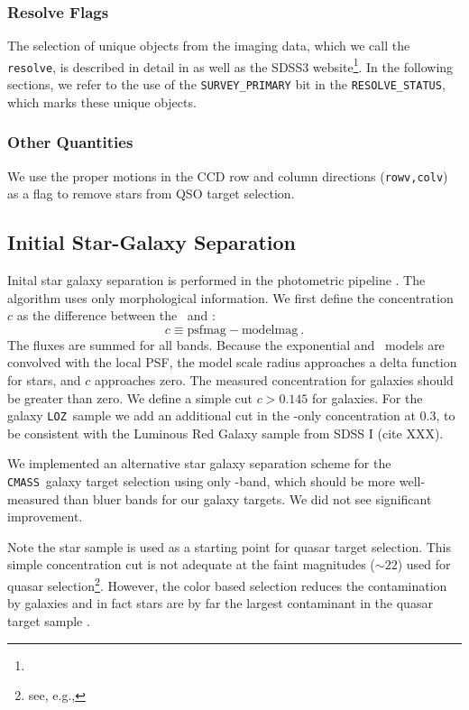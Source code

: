\documentclass[12pt,preprint]{aastex}
\newcommand{\loz}{\texttt{LOZ}}
\newcommand{\cmass}{\texttt{CMASS}}
\begin{document}
\subsubsection{Resolve Flags} \label{sec:resolve}

The selection of unique objects from the imaging data, which we call the
\texttt{resolve}, is described in detail in \citet{dr8} as well as the SDSS3
website\footnote{\DRateresolve}.  In the following sections, we refer to the
use of the \texttt{SURVEY\_PRIMARY} bit in the \texttt{RESOLVE\_STATUS}, which
marks these unique objects.

\subsubsection{Other Quantities}

We use the proper motions in the CCD row and column directions
(\texttt{rowv,colv}) as a flag to remove stars from QSO target selection.


\subsection{Initial Star-Galaxy Separation} \label{sec:sgsep}

Inital star galaxy separation is performed in the photometric pipeline \photo.
The algorithm uses only morphological information.  We first define
the concentration $c$ as the difference between the 
\psfmag\ and \modelmag:
\begin{equation}
c \equiv \textrm{psfmag} - \textrm{modelmag}~.
\end{equation}
The fluxes are summed for all bands.  Because the exponential and
\devauc\ models are convolved with the local PSF, the model scale radius
approaches a delta function for stars, and $c$ approaches zero.  The measured
concentration for galaxies should be greater than zero.  We define a simple cut
$c > 0.145$ for galaxies.  For the galaxy \loz\ sample we add an additional
cut in the \rmag-only concentration at 0.3, to be consistent with 
the Luminous Red Galaxy sample from SDSS I (cite XXX).

We implemented an alternative star galaxy separation scheme for the \cmass\
galaxy target selection using only \imag-band, which should be more
well-measured than bluer bands for our galaxy targets. We did not see
significant improvement.

Note the star sample is used as a starting point for quasar target selection.
This simple concentration cut is not adequate at the faint magnitudes
(\gmag$\sim 22$) used for quasar selection\footnote{see, e.g., \DRsevsg}.
However, the color based selection reduces the contamination by galaxies and in
fact stars are by far the largest contaminant in the quasar target sample
\citep{RossQTS}.
\end{document}
